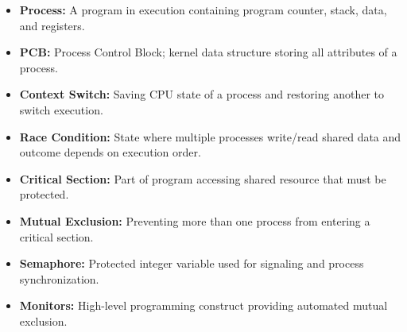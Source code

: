 \documentclass[12pt,a4paper]{article}
\begin{document}
\begin{tcolorbox}[defbox, title={\textbf{One-Line Definitions}}]
\begin{itemize}[leftmargin=*, itemsep=2.5pt, topsep=0pt]
  \item \textbf{Process:} A program in execution containing program counter, stack, data, and registers.
  \item \textbf{PCB:} Process Control Block; kernel data structure storing all attributes of a process.
  \item \textbf{Context Switch:} Saving CPU state of a process and restoring another to switch execution.
  \item \textbf{Race Condition:} State where multiple processes write/read shared data and outcome depends on execution order.
  \item \textbf{Critical Section:} Part of program accessing shared resource that must be protected.
  \item \textbf{Mutual Exclusion:} Preventing more than one process from entering a critical section.
  \item \textbf{Semaphore:} Protected integer variable used for signaling and process synchronization.
  \item \textbf{Monitors:} High-level programming construct providing automated mutual exclusion.
\end{itemize}
\end{tcolorbox}
\end{document}
